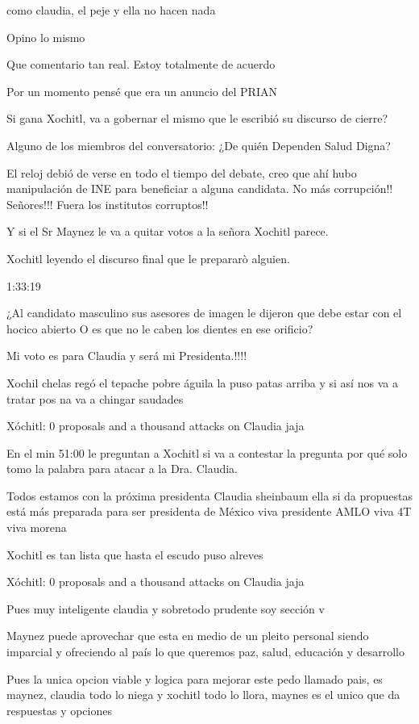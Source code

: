 como claudia, el peje y ella no hacen nada

Opino lo mismo

Que comentario tan real. Estoy totalmente de acuerdo

Por un momento pensé que era un anuncio del PRIAN

Si gana Xochitl, va a gobernar el mismo que le escribió su discurso de cierre?

Alguno de los miembros del conversatorio: ¿De quién Dependen Salud Digna?

El reloj debió de verse en todo el tiempo del debate, creo que ahí hubo manipulación de INE para beneficiar a alguna candidata. No más corrupción!! Señores!!! Fuera los institutos corruptos!!

Y si el Sr Maynez le va a quitar votos a la señora Xochitl parece.

Xochitl leyendo el discurso final que le prepararò alguien.

1:33:19

¿Al candidato masculino sus asesores de imagen le dijeron que debe estar con el hocico abierto O es que no le caben los dientes en ese orificio?

Mi voto es para Claudia y será mi Presidenta.!!!!

Xochil  chelas regó el tepache pobre águila la puso patas arriba y si así nos va a tratar pos na va a chingar saudades

Xóchitl: 0 proposals and a thousand attacks on Claudia jaja

En el min 51:00 le preguntan a Xochitl si va a contestar la pregunta por qué solo tomo la palabra para atacar a la Dra. Claudia.

Todos estamos con la próxima presidenta Claudia sheinbaum ella si da propuestas está más preparada para ser presidenta  de México viva presidente AMLO viva 4T viva morena

Xochitl es tan lista que hasta el escudo puso alreves

Xóchitl: 0 proposals and a thousand attacks on Claudia jaja

Pues muy inteligente claudia y sobretodo prudente soy sección v

Maynez puede aprovechar que esta en medio de un pleito personal siendo imparcial y ofreciendo al país lo que queremos paz, salud, educación y desarrollo

Pues la unica opcion viable y logica para mejorar este pedo llamado pais, es maynez, claudia todo lo niega y xochitl todo lo llora, maynes es el unico que da respuestas y opciones

